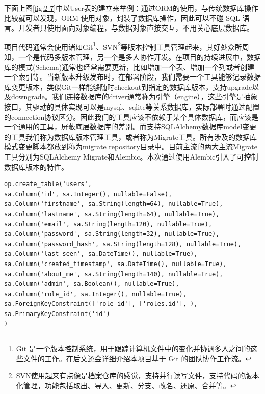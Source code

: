 下面上图\ref{fig:2-7}中以User表的建立来举例：通过ORM的使用，与传统数据库操作比较就可以发现，ORM 使用对象，封装了数据库操作，因此可以不碰 SQL 语言。开发者只使用面向对象编程，与数据对象直接交互，不用关心底层数据库。

项目代码通常会使用诸如Git\footnote{Git 是一个版本控制系统，用于跟踪计算机文件中的变化并协调多人之间的这些文件的工作。在后文还会详细介绍本项目基于 Git 的团队协作工作流。}、SVN\footnote{SVN使用起来有点像是档案仓库的感觉，支持并行读写文件，支持代码的版本化管理，功能包括取出、导入、更新、分支、改名、还原、合并等。}等版本控制工具管理起来，其好处众所周知，一个是代码多版本管理，另一个是多人协作开发。在项目的持续进展中，数据库的模式(Schema)通常也经常需要更新，比如增加一个表、增加一个列或者创建一个索引等。当新版本升级发布时，在部署阶段，我们需要一个工具能够记录数据库变更版本，类似Git一样能够随时checkout到指定的数据库版本，支持upgrade以及downgrade。我们连接数据库的driver通常称为引擎（engine），这些引擎是抽象接口，其驱动的具体实现可以是mysql、sqlite等关系数据库，实际部署时通过配置的connection协议区分。因此我们的工具应该不依赖于某个具体数据库，而应该是一个通用的工具，屏蔽底层数据库的差别。而支持SQLAlchemy数据库model变更的工具我们称为数据库版本管理工具，或者称为Migrate工具。所有涉及的数据库模式变更脚本都放到称为migrate repository目录中。目前主流的两大主流Migrate工具分别为SQLAlchemy Migrate和Alembic。本次通过使用Alembic引入了可控制数据库版本的特性。

\begin{lstlisting}
op.create_table('users',
sa.Column('id', sa.Integer(), nullable=False),
sa.Column('firstname', sa.String(length=64), nullable=True),
sa.Column('lastname', sa.String(length=64), nullable=True),
sa.Column('email', sa.String(length=120), nullable=True),
sa.Column('password', sa.String(length=32), nullable=True),
sa.Column('password_hash', sa.String(length=128), nullable=True),
sa.Column('last_seen', sa.DateTime(), nullable=True),
sa.Column('created_timestamp', sa.DateTime(), nullable=True),
sa.Column('about_me', sa.String(length=140), nullable=True),
sa.Column('admin', sa.Boolean(), nullable=True),
sa.Column('role_id', sa.Integer(), nullable=True),
sa.ForeignKeyConstraint(['role_id'], ['roles.id'], ),
sa.PrimaryKeyConstraint('id')
)
\end{lstlisting}

